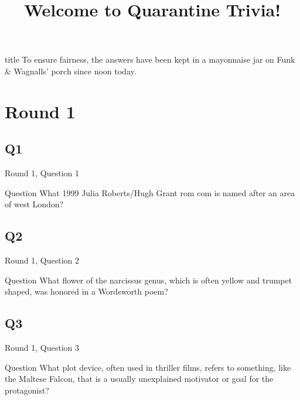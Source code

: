 \documentclass[11pt]{beamer}
\begin{document}
\title{Welcome to Quarantine Trivia!}
\date{}

\begin{frame}
\titlepage{}
\end{frame}

\begingroup{}
\begin{frame}
\vfill{}
\centering{}
\begin{beamercolorbox}[sep=8pt,center,shadow=true,rounded=true]{title}
To ensure fairness, the answers have been kept in a mayonnaise jar on Funk \& Wagnalls’ porch since noon today.
\end{beamercolorbox}
\vfill{}
\end{frame}
\endgroup{}
    

\section{Round 1}
    

\subsection*{Q1}
\begin{frame}[t]{Round 1, Question 1}
\vspace{2em}
\begin{block}{Question}
What 1999 Julia Roberts/Hugh Grant rom com is named after an area of west London\@?
\end{block}
\end{frame}
    

\subsection*{Q2}
\begin{frame}[t]{Round 1, Question 2}
\vspace{2em}
\begin{block}{Question}
What flower of the narcissus genus, which is often yellow and trumpet shaped, was honored in a Wordsworth poem\@?
\end{block}
\end{frame}
    

\subsection*{Q3}
\begin{frame}[t]{Round 1, Question 3}
\vspace{2em}
\begin{block}{Question}
What plot device, often used in thriller films, refers to something, like the Maltese Falcon, that is a usually unexplained motivator or goal for the protagonist\@?
\end{block}
\end{frame}
    
\end{document}
